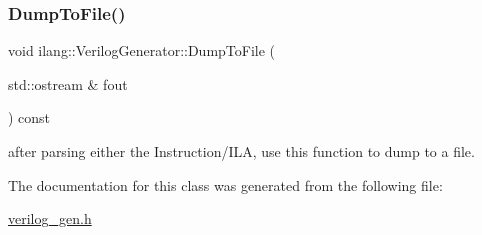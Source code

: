 \subsubsection{\texorpdfstring{Dump\+To\+File()}{DumpToFile()}}
{\footnotesize\ttfamily void ilang\+::\+Verilog\+Generator\+::\+Dump\+To\+File (\begin{DoxyParamCaption}\item[{std\+::ostream \&}]{fout }\end{DoxyParamCaption}) const}

after parsing either the Instruction/\+I\+LA, use this function to dump to a file. 

The documentation for this class was generated from the following file\+:\begin{DoxyCompactItemize}
\item 
\mbox{\hyperlink{verilog__gen_8h}{verilog\+\_\+gen.\+h}}\end{DoxyCompactItemize}
